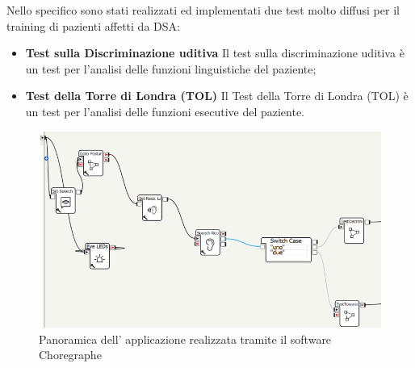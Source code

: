 \begin{sloppypar}
{Nello specifico sono stati realizzati ed implementati due test molto diffusi per il training di pazienti affetti da DSA:
\begin{itemize}
\vspace{0.7cm}
    \item \textbf{Test sulla Discriminazione uditiva}\newline
    Il test sulla discriminazione uditiva è un test per l’analisi  delle funzioni linguistiche del paziente;
\vspace{1.2cm}
    \item \textbf{Test della Torre di Londra (TOL)}\newline
    Il Test della Torre di Londra (TOL) è un test per l’analisi delle funzioni esecutive del paziente.
\end{itemize}
\begin{figure}[H]
\centering
\includegraphics[width=1\textwidth]{immagini/applicazione.png}
\caption{Panoramica dell' applicazione realizzata tramite  il software Choregraphe}
\end{figure}
}

\newpage

\end{sloppypar}
